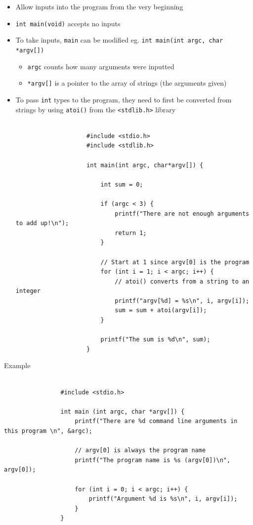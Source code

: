 \documentclass{article}
\begin{document}
		\begin{itemize}
			\item Allow inputs into the program from the very beginning
			\item \texttt{int main(void)} accepts no inputs
			\item To take inputs, \texttt{main} can be modified eg. \texttt{int main(int argc, char *argv[])}
				\begin{itemize}
					\item \texttt{argc} counts how many arguments were inputted
					\item \texttt{*argv[]} is a pointer to the array of strings (the arguments given)
				\end{itemize}
			\item To pass \texttt{int} types to the program, they need to first be converted from strings by using \texttt{atoi()} from the \texttt{<stdlib.h>} library
				\begin{verbatim}

					#include <stdio.h>
					#include <stdlib.h>

					int main(int argc, char*argv[]) {
						
						int sum = 0;

						if (argc < 3) {
							printf("There are not enough arguments to add up!\n");
							return 1;
						}

						// Start at 1 since argv[0] is the program
						for (int i = 1; i < argc; i++) {
							// atoi() converts from a string to an integer
							printf("argv[%d] = %s\n", i, argv[i]);
							sum = sum + atoi(argv[i]);
						}

						printf("The sum is %d\n", sum);
					}

				\end{verbatim}
		\end{itemize}

		\begin{question}{Example}
			\begin{verbatim}
				
				#include <stdio.h>

				int main (int argc, char *argv[]) {
					printf("There are %d command line arguments in this program \n", &argc);

					// argv[0] is always the program name
					printf("The program name is %s (argv[0])\n", argv[0]);

					for (int i = 0; i < argc; i++) {
						printf("Argument %d is %s\n", i, argv[i]);
					}
				}
				
			\end{verbatim}
		\end{question}
\end{document}
